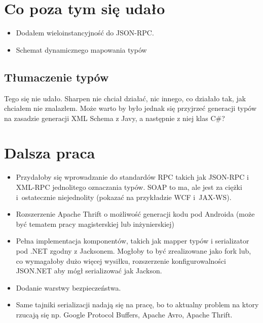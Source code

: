 \section{Co poza tym się udało}
\begin{itemize}
	\item Dodałem wieloinstancyjność do JSON-RPC.
	\item Schemat dynamicznego mapowania typów
\end{itemize}


\subsection{Tłumaczenie typów}
Tego się nie udało. Sharpen nie chciał działać, nic innego, co działało tak, jak chciałem nie znalazłem. Może warto by było jednak się przyjrzeć generacji typów na zasadzie generacji XML Schema z Javy, a następnie z niej klas C\#?



\section{Dalsza praca}
\begin{itemize}
	\item Przydałoby się wprowadzanie do standardów RPC takich jak JSON-RPC i XML-RPC jednolitego oznaczania typów. SOAP to ma, ale jest za ciężki i~ostatecznie niejednolity (pokazać na przykładzie WCF i~JAX-WS).
	\item Rozszerzenie Apache Thrift o możliwość generacji kodu pod Androida (może być tematem pracy magisterskiej lub inżynierskiej)
	\item Pełna implementacja komponentów, takich jak mapper typów i serializator pod .NET zgodny z Jacksonem. Mogłoby to być zrealizowane jako fork lub, co wymagałoby dużo więcej wysiłku, rozszerzenie konfigurowalności JSON.NET aby mógł serializować jak Jackson.
	\item Dodanie warstwy bezpieczeństwa.
	\item Same tajniki serializacji nadają się na pracę, bo to aktualny problem na ktory rzucają się np. Google Protocol Buffers, Apache Avro, Apache Thrift.
\end{itemize}



